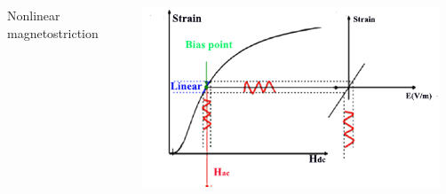 \documentclass[compress]{beamer}
\begin{document}
\begin{frame}
\begin{columns}[totalwidth=\textwidth]
\begin{column}{.25\textwidth}
   Nonlinear magnetostriction
   \end{column}
    \begin{column}{.75\textwidth}
	\includegraphics[width=0.95\textwidth]{Graphic/02_biaspoint2.pdf}
	\end{column}
\end{columns}	
\end{frame}
\end{document}

